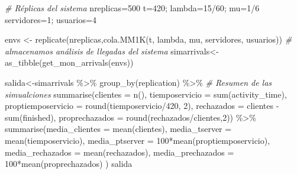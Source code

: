 \documentclass[
]{book}
\newenvironment{Shaded}{\begin{snugshade}}{\end{snugshade}}
\newcommand{\AttributeTok}[1]{\textcolor[rgb]{0.77,0.63,0.00}{#1}}
\newcommand{\CommentTok}[1]{\textcolor[rgb]{0.56,0.35,0.01}{\textit{#1}}}
\newcommand{\DecValTok}[1]{\textcolor[rgb]{0.00,0.00,0.81}{#1}}
\newcommand{\FunctionTok}[1]{\textcolor[rgb]{0.00,0.00,0.00}{#1}}
\newcommand{\NormalTok}[1]{#1}
\newcommand{\OtherTok}[1]{\textcolor[rgb]{0.56,0.35,0.01}{#1}}
\newcommand{\SpecialCharTok}[1]{\textcolor[rgb]{0.00,0.00,0.00}{#1}}
\theoremstyle{definition}
\theoremstyle{definition}
\theoremstyle{definition}
\theoremstyle{definition}
\theoremstyle{remark}
\begin{document}
\begin{Shaded}
\begin{Highlighting}[]
\CommentTok{\# Réplicas del sistema}
\NormalTok{nreplicas}\OtherTok{=}\DecValTok{500}
\NormalTok{t}\OtherTok{=}\DecValTok{420}\NormalTok{; }
\NormalTok{lambda}\OtherTok{=}\DecValTok{15}\SpecialCharTok{/}\DecValTok{60}\NormalTok{; mu}\OtherTok{=}\DecValTok{1}\SpecialCharTok{/}\DecValTok{6}
\NormalTok{servidores}\OtherTok{=}\DecValTok{1}\NormalTok{; usuarios}\OtherTok{=}\DecValTok{4}

\NormalTok{envs }\OtherTok{\textless{}{-}} \FunctionTok{replicate}\NormalTok{(nreplicas,}\FunctionTok{cola.MM1K}\NormalTok{(t, lambda, mu, servidores, usuarios))}
\CommentTok{\# almacenamos análisis de llegadas del sistema}
\NormalTok{simarrivals}\OtherTok{\textless{}{-}}\FunctionTok{as\_tibble}\NormalTok{(}\FunctionTok{get\_mon\_arrivals}\NormalTok{(envs))}

\NormalTok{salida}\OtherTok{\textless{}{-}}\NormalTok{simarrivals }\SpecialCharTok{\%\textgreater{}\%} 
  \FunctionTok{group\_by}\NormalTok{(replication) }\SpecialCharTok{\%\textgreater{}\%} 
  \CommentTok{\# Resumen de las simualciones}
  \FunctionTok{summarise}\NormalTok{(}\AttributeTok{clientes =} \FunctionTok{n}\NormalTok{(), }
            \AttributeTok{tiemposervicio =} \FunctionTok{sum}\NormalTok{(activity\_time),}
            \AttributeTok{proptiemposervicio =} \FunctionTok{round}\NormalTok{(tiemposervicio}\SpecialCharTok{/}\DecValTok{420}\NormalTok{, }\DecValTok{2}\NormalTok{),}
            \AttributeTok{rechazados =}\NormalTok{ clientes }\SpecialCharTok{{-}} \FunctionTok{sum}\NormalTok{(finished),}
            \AttributeTok{proprechazados =} \FunctionTok{round}\NormalTok{(rechazados}\SpecialCharTok{/}\NormalTok{clientes,}\DecValTok{2}\NormalTok{)) }\SpecialCharTok{\%\textgreater{}\%} 
  \FunctionTok{summarise}\NormalTok{(}\AttributeTok{media\_clientes =} \FunctionTok{mean}\NormalTok{(clientes),}
            \AttributeTok{media\_tserver =} \FunctionTok{mean}\NormalTok{(tiemposervicio),}
            \AttributeTok{media\_ptserver =} \DecValTok{100}\SpecialCharTok{*}\FunctionTok{mean}\NormalTok{(proptiemposervicio),}
            \AttributeTok{media\_rechazados =} \FunctionTok{mean}\NormalTok{(rechazados),}
            \AttributeTok{media\_prechazados =} \DecValTok{100}\SpecialCharTok{*}\FunctionTok{mean}\NormalTok{(proprechazados)}
\NormalTok{            )}
\NormalTok{salida}
\end{Highlighting}
\end{Shaded}
\end{document}
